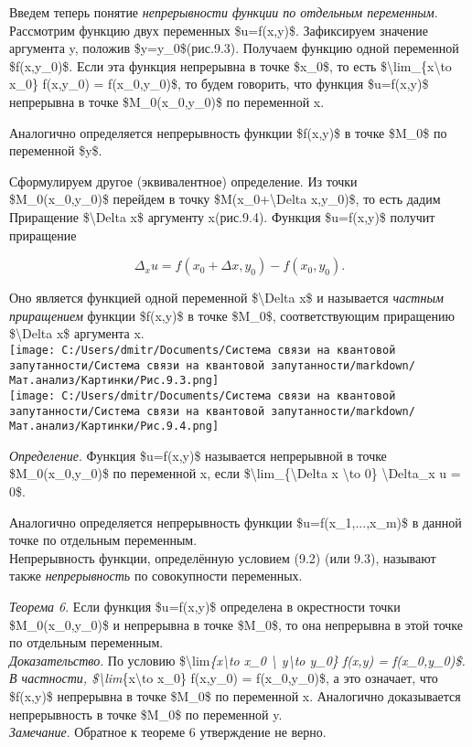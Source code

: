 \documentclass[
]{article}
\begin{document}
Введем теперь понятие \emph{непрерывности функции по отдельным
переменным}.\\
Рассмотрим функцию двух переменных \$u=f(x,y)\$. Зафиксируем значение
аргумента y, положив \$y=y\_0\$(рис.9.3). Получаем функцию одной
переменной \$f(x,y\_0)\$. Если эта функция непрерывна в точке \$x\_0\$,
то есть \$\textbackslash lim\_\{x\textbackslash to x\_0\} f(x,y\_0) =
f(x\_0,y\_0)\$, то будем говорить, что функция \$u=f(x,y)\$ непрерывна в
точке \$M\_0(x\_0,y\_0)\$ по переменной x.

Аналогично определяется непрерывность функции \$f(x,y)\$ в точке
\$M\_0\$ по переменной \$y\$.

Сформулируем другое (эквивалентное) определение. Из точки\\
\$M\_0(x\_0,y\_0)\$ перейдем в точку \$M(x\_0+\textbackslash Delta
x,y\_0)\$, то есть дадим\\
Приращение \$\textbackslash Delta x\$ аргументу x(рис.9.4). Функция
\$u=f(x,y)\$ получит приращение

\[\Delta_x u = f(x_0 + \Delta x,y_0) - f(x_0,y_0).\]

Оно является функцией одной переменной \$\textbackslash Delta x\$ и
называется \emph{частным приращением} функции \$f(x,y)\$ в точке
\$M\_0\$, соответствующим приращению \$\textbackslash Delta x\$
аргумента x.\\
\texttt{[image: C:/Users/dmitr/Documents/Система связи на квантовой запутанности/Система связи на квантовой запутанности/markdown/Мат.анализ/Картинки/Рис.9.3.png]}\\
\texttt{[image: C:/Users/dmitr/Documents/Система связи на квантовой запутанности/Система связи на квантовой запутанности/markdown/Мат.анализ/Картинки/Рис.9.4.png]}

\emph{Определение}. Функция \$u=f(x,y)\$ называется непрерывной в точке
\$M\_0(x\_0,y\_0)\$ по переменной x, если
\$\textbackslash lim\_\{\textbackslash Delta x \textbackslash to 0\}
\textbackslash Delta\_x u = 0\$.

Аналогично определяется непрерывность функции \$u=f(x\_1,...,x\_m)\$ в
данной точке по отдельным переменным.\\
Непрерывность функции, определённую условием (9.2) (или 9.3), называют
также \emph{непрерывность} по совокупности переменных.

\emph{Теорема 6}. Если функция \$u=f(x,y)\$ определена в окрестности
точки \$M\_0(x\_0,y\_0)\$ и непрерывна в точке \$M\_0\$, то она
непрерывна в этой точке по отдельным переменным.\\
\emph{Доказательство}. По условию
\$\textbackslash lim\emph{\{x\textbackslash to x\_0 \textbackslash{}
y\textbackslash to y\_0\} f(x,y) = f(x\_0,y\_0)\$. В частности,
\$\textbackslash lim}\{x\textbackslash to x\_0\} f(x,y\_0) =
f(x\_0,y\_0)\$, а это означает, что \$f(x,y)\$ непрерывна в точке
\$M\_0\$ по переменной x. Аналогично доказывается непрерывность в точке
\$M\_0\$ по переменной y.\\
\emph{Замечание}. Обратное к теореме 6 утверждение не верно.
\end{document}
